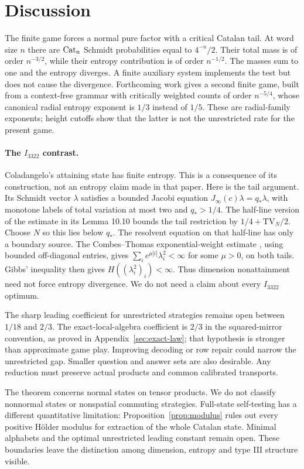 \section{Discussion}\label{sec:discussion}
The finite game forces a normal pure factor with a critical Catalan tail. At word size $n$ there are $\operatorname{Cat}_n$ Schmidt probabilities equal to $4^{-n}/2$. Their total mass is of order $n^{-3/2}$, while their entropy contribution is of order $n^{-1/2}$. The masses sum to one and the entropy diverges. A finite auxiliary system implements the test but does not cause the divergence. Forthcoming work gives a second finite game, built from a context-free grammar with critically weighted counts of order $n^{-5/4}$, whose canonical radial entropy exponent is $1/3$ instead of $1/5$. These are radial-family exponents; height cutoffs show that the latter is not the unrestricted rate for the present game.

\paragraph{The $I_{3322}$ contrast.}
Coladangelo's attaining state \cite[Definition 10.12 and Theorem 10.14]{I3322} has finite entropy. This is a consequence of its construction, not an entropy claim made in that paper. Here is the tail argument. Its Schmidt vector $\lambda$ satisfies a bounded Jacobi equation $J_\infty(c)\lambda=q_*\lambda$, with monotone labels of total variation at most two and $q_*>1/4$. The half-line version of the estimate in its Lemma 10.10 bounds the tail restriction by $1/4+\mathrm{TV}_N/2$. Choose $N$ so this lies below $q_*$. The resolvent equation on that half-line has only a boundary source. The Combes--Thomas exponential-weight estimate \cite{CT}, using bounded off-diagonal entries, gives $\sum_ie^{\mu|i|}\lambda_i^2<\infty$ for some $\mu>0$, on both tails. Gibbs' inequality then gives $H((\lambda_i^2)_i)<\infty$. Thus dimension nonattainment need not force entropy divergence. We do not need a claim about every $I_{3322}$ optimum.

The sharp leading coefficient for unrestricted strategies remains open between $1/18$ and $2/3$. The exact-local-algebra coefficient is $2/3$ in the squared-mirror convention, as proved in Appendix~\ref{sec:exact-law}; that hypothesis is stronger than approximate game play. Improving decoding or row repair could narrow the unrestricted gap. Smaller question and answer sets are also desirable. Any reduction must preserve actual products and common calibrated transports.

The theorem concerns normal states on tensor products. We do not classify nonnormal states or nonspatial commuting strategies. Full-state self-testing has a different quantitative limitation: Proposition~\ref{prop:modulus} rules out every positive H\"older modulus for extraction of the whole Catalan state. Minimal alphabets and the optimal unrestricted leading constant remain open. These boundaries leave the distinction among dimension, entropy and type III structure visible.
